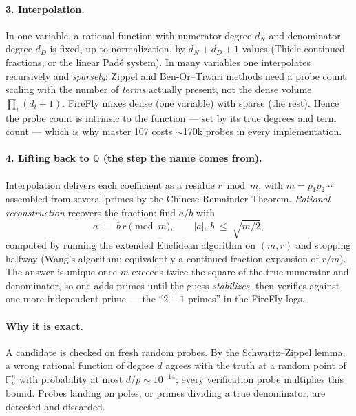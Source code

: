 \documentclass[11pt]{article}
\newcommand{\Fp}{\mathbb{F}_p}
\newcommand{\Q}{\mathbb{Q}}
\begin{document}
\paragraph{3. Interpolation.}
In one variable, a rational function with numerator degree $d_N$ and
denominator degree $d_D$ is fixed, up to normalization, by
$d_N + d_D + 1$ values (Thiele continued fractions, or the linear
Pad\'e system).  In many variables one interpolates recursively and
\emph{sparsely}: Zippel and Ben-Or--Tiwari methods need a probe count
scaling with the number of \emph{terms} actually present, not the
dense volume $\prod_i (d_i + 1)$.  FireFly mixes dense (one variable)
with sparse (the rest).  Hence the probe count is intrinsic to the
function --- set by its true degrees and term count --- which is why
master 107 costs $\sim$170k probes in every implementation.

\paragraph{4. Lifting back to $\Q$ (the step the name comes from).}
Interpolation delivers each coefficient as a residue
$r \bmod m$, with $m = p_1 p_2 \cdots$ assembled from several primes
by the Chinese Remainder Theorem.  \emph{Rational reconstruction}
recovers the fraction: find $a/b$ with
\[
  a \;\equiv\; b\, r \pmod m,
  \qquad |a|,\, b \;\le\; \sqrt{m/2},
\]
computed by running the extended Euclidean algorithm on $(m, r)$ and
stopping halfway (Wang's algorithm; equivalently a continued-fraction
expansion of $r/m$).  The answer is unique once $m$ exceeds twice the
square of the true numerator and denominator, so one adds primes
until the guess \emph{stabilizes}, then verifies against one more
independent prime --- the ``$2+1$ primes'' in the FireFly logs.

\paragraph{Why it is exact.}
A candidate is checked on fresh random probes.  By the
Schwartz--Zippel lemma, a wrong rational function of degree $d$
agrees with the truth at a random point of $\Fp^n$ with probability
at most $d/p \sim 10^{-14}$; every verification probe multiplies this
bound.  Probes landing on poles, or primes dividing a true
denominator, are detected and discarded.
\end{document}
